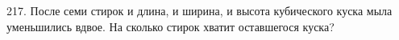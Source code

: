217. После семи стирок и длина, и ширина, и высота кубического куска мыла уменьшились вдвое. На сколько стирок хватит оставшегося куска?\\
